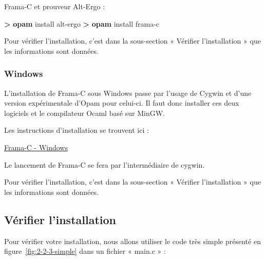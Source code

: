 \documentclass[12pt,francais,]{scrbook}
\newenvironment{Shaded}{}{}
\newcommand{\KeywordTok}[1]{\textcolor[rgb]{0.00,0.44,0.13}{\textbf{{#1}}}}
\newcommand{\NormalTok}[1]{{#1}}
\begin{document}
Frama-C et prouveur Alt-Ergo :

\begin{footnotesize}\begin{Shaded}
\begin{Highlighting}[]
\KeywordTok{>} \KeywordTok{opam} \NormalTok{install alt-ergo}
\KeywordTok{>} \KeywordTok{opam} \NormalTok{install frama-c}
\end{Highlighting}
\end{Shaded}\end{footnotesize}

Pour vérifier l'installation, c'est dans la sous-section « Vérifier
l'installation » que les informations sont données.

\subsubsection{Windows}\label{windows}

L'installation de Frama-C sous Windows passe par l'usage de Cygwin et
d'une version expérimentale d'Opam pour celui-ci. Il faut donc installer
ces deux logiciels et le compilateur Ocaml basé sur MinGW.

Les instructions d'installation se trouvent ici :

\href{https://bts.frama-c.com/dokuwiki/doku.php?id=mantis:frama-c:compiling_from_source}{Frama-C
- Windows}

Le lancement de Frama-C se fera par l'intermédiaire de cygwin.

Pour vérifier l'installation, c'est dans la sous-section « Vérifier
l'installation » que les informations sont données.

\subsection{Vérifier l'installation}\label{vuxe9rifier-linstallation}

Pour vérifier votre installation, nous allons utiliser le code très
simple présenté en figure~\ref{fig:2-2-3-simple} dans un fichier « main.c » :
\end{document}
